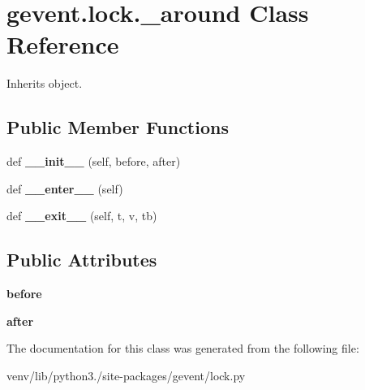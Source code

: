 \hypertarget{classgevent_1_1lock_1_1__around}{}\section{gevent.\+lock.\+\_\+around Class Reference}
\label{classgevent_1_1lock_1_1__around}


Inherits object.

\subsection*{Public Member Functions}
\begin{DoxyCompactItemize}
\item 
\mbox{\label{classgevent_1_1lock_1_1__around_ada566599537ba9933e7da42c736900ad}} 
def {\bfseries \+\_\+\+\_\+init\+\_\+\+\_\+} (self, before, after)
\item 
\mbox{\label{classgevent_1_1lock_1_1__around_aecd0b25afb31410993c57b782c099abe}} 
def {\bfseries \+\_\+\+\_\+enter\+\_\+\+\_\+} (self)
\item 
\mbox{\label{classgevent_1_1lock_1_1__around_af742b5b73302a30ff3080bdb3d4b5587}} 
def {\bfseries \+\_\+\+\_\+exit\+\_\+\+\_\+} (self, t, v, tb)
\end{DoxyCompactItemize}
\subsection*{Public Attributes}
\begin{DoxyCompactItemize}
\item 
\mbox{\label{classgevent_1_1lock_1_1__around_aa5317a85ec95d362158618f03372fc1b}} 
{\bfseries before}
\item 
\mbox{\label{classgevent_1_1lock_1_1__around_ac6677ed4c92a19e946f8586e8ad6e218}} 
{\bfseries after}
\end{DoxyCompactItemize}


The documentation for this class was generated from the following file\+:\begin{DoxyCompactItemize}
\item 
venv/lib/python3./site-\/packages/gevent/lock.\+py\end{DoxyCompactItemize}
